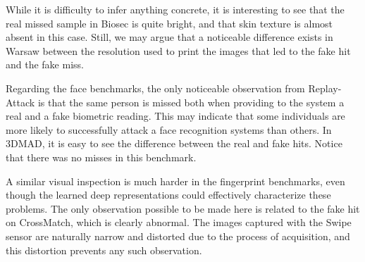 While it is difficulty to infer anything concrete, it is interesting to see that the real missed sample in Biosec is quite bright, and that skin texture is almost absent in this case. 
Still, we may argue that a noticeable difference exists in Warsaw between the resolution used to print the images that led to the fake hit and the fake miss.

Regarding the face benchmarks, the only noticeable observation from Replay-Attack is that the same person is missed both when providing to the system a real and a fake biometric reading. This may indicate that some individuals are more likely to successfully attack a face recognition systems than others. In 3DMAD, it is easy to see the difference between the real and fake hits. Notice that there was no misses in this benchmark.

A similar visual inspection is much harder in the fingerprint benchmarks, even though the learned deep representations could effectively characterize these problems. The only observation possible to be made here is related to the fake hit on CrossMatch, which is clearly abnormal.
The images captured with the Swipe sensor are naturally narrow and distorted due to the process of acquisition, and this distortion prevents any such observation.